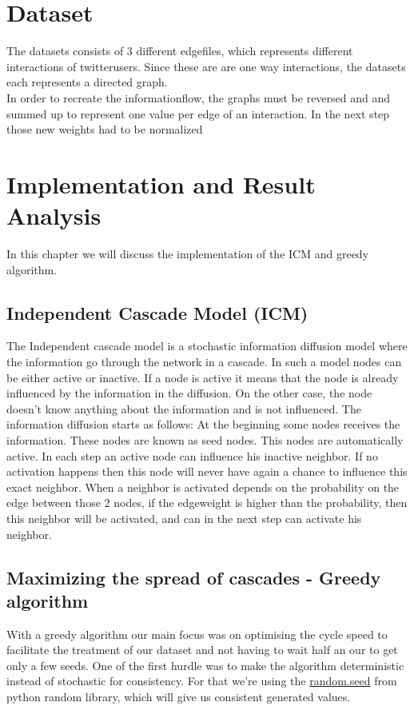 
\section{Dataset}
The datasets consists of 3 different edgefiles, which represents different interactions of twitterusers. Since these are are one way interactions, the datasets each represents a directed graph.\\
 In order to recreate the informationflow, the graphs must be reversed and and summed up to represent one value per edge of an interaction. In the next step those new weights had to be normalized
\section{Implementation and Result Analysis}
In this chapter we will discuss the implementation of the ICM and greedy algorithm.
\subsection{Independent Cascade Model (ICM)}
The Independent cascade model is a stochastic information diffusion model where the information go through the network in a cascade. In such a model nodes can be either active or inactive. If a node is active it means that the node is already influenced by the information in the diffusion. On the other case, the node doesn't know anything about the information and is not influenced.
The information diffusion starts as follows: At the beginning some nodes receives the information. These nodes are known as seed nodes. This nodes are automatically active. In each step an active node can influence his inactive neighbor. If no activation happens then this node will never have again a chance to influence this exact neighbor. When a neighbor is activated depends on the probability on the edge between those 2 nodes, if the edgeweight is higher than the probability, then this neighbor will be activated, and can in the next step can activate his neighbor.
\subsection{Maximizing the spread of cascades - Greedy algorithm}

With a greedy algorithm our main focus was on optimising the cycle speed to facilitate the treatment of our dataset and not having to wait half an our to get only a few seeds.
One of the first hurdle was to make the algorithm deterministic instead of stochastic for consistency. For that we're using the \href{https://docs.python.org/3.8/library/random.html#random.seed}{random.seed} from python random library, which will give us consistent generated values.

